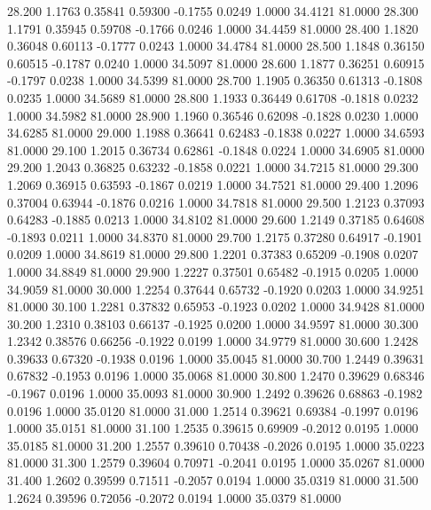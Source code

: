   28.200   1.1763   0.35841   0.59300  -0.1755   0.0249   1.0000  34.4121  81.0000
  28.300   1.1791   0.35945   0.59708  -0.1766   0.0246   1.0000  34.4459  81.0000
  28.400   1.1820   0.36048   0.60113  -0.1777   0.0243   1.0000  34.4784  81.0000
  28.500   1.1848   0.36150   0.60515  -0.1787   0.0240   1.0000  34.5097  81.0000
  28.600   1.1877   0.36251   0.60915  -0.1797   0.0238   1.0000  34.5399  81.0000
  28.700   1.1905   0.36350   0.61313  -0.1808   0.0235   1.0000  34.5689  81.0000
  28.800   1.1933   0.36449   0.61708  -0.1818   0.0232   1.0000  34.5982  81.0000
  28.900   1.1960   0.36546   0.62098  -0.1828   0.0230   1.0000  34.6285  81.0000
  29.000   1.1988   0.36641   0.62483  -0.1838   0.0227   1.0000  34.6593  81.0000
  29.100   1.2015   0.36734   0.62861  -0.1848   0.0224   1.0000  34.6905  81.0000
  29.200   1.2043   0.36825   0.63232  -0.1858   0.0221   1.0000  34.7215  81.0000
  29.300   1.2069   0.36915   0.63593  -0.1867   0.0219   1.0000  34.7521  81.0000
  29.400   1.2096   0.37004   0.63944  -0.1876   0.0216   1.0000  34.7818  81.0000
  29.500   1.2123   0.37093   0.64283  -0.1885   0.0213   1.0000  34.8102  81.0000
  29.600   1.2149   0.37185   0.64608  -0.1893   0.0211   1.0000  34.8370  81.0000
  29.700   1.2175   0.37280   0.64917  -0.1901   0.0209   1.0000  34.8619  81.0000
  29.800   1.2201   0.37383   0.65209  -0.1908   0.0207   1.0000  34.8849  81.0000
  29.900   1.2227   0.37501   0.65482  -0.1915   0.0205   1.0000  34.9059  81.0000
  30.000   1.2254   0.37644   0.65732  -0.1920   0.0203   1.0000  34.9251  81.0000
  30.100   1.2281   0.37832   0.65953  -0.1923   0.0202   1.0000  34.9428  81.0000
  30.200   1.2310   0.38103   0.66137  -0.1925   0.0200   1.0000  34.9597  81.0000
  30.300   1.2342   0.38576   0.66256  -0.1922   0.0199   1.0000  34.9779  81.0000
  30.600   1.2428   0.39633   0.67320  -0.1938   0.0196   1.0000  35.0045  81.0000
  30.700   1.2449   0.39631   0.67832  -0.1953   0.0196   1.0000  35.0068  81.0000
  30.800   1.2470   0.39629   0.68346  -0.1967   0.0196   1.0000  35.0093  81.0000
  30.900   1.2492   0.39626   0.68863  -0.1982   0.0196   1.0000  35.0120  81.0000
  31.000   1.2514   0.39621   0.69384  -0.1997   0.0196   1.0000  35.0151  81.0000
  31.100   1.2535   0.39615   0.69909  -0.2012   0.0195   1.0000  35.0185  81.0000
  31.200   1.2557   0.39610   0.70438  -0.2026   0.0195   1.0000  35.0223  81.0000
  31.300   1.2579   0.39604   0.70971  -0.2041   0.0195   1.0000  35.0267  81.0000
  31.400   1.2602   0.39599   0.71511  -0.2057   0.0194   1.0000  35.0319  81.0000
  31.500   1.2624   0.39596   0.72056  -0.2072   0.0194   1.0000  35.0379  81.0000
